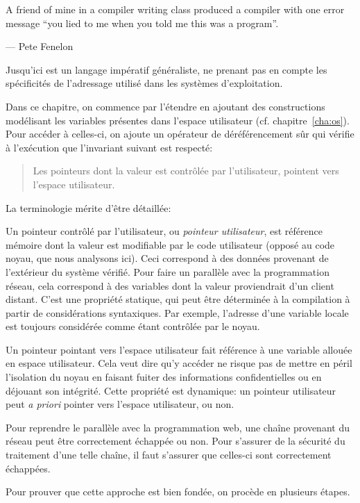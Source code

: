 \epigraph{
  A friend of mine in a compiler writing class produced a compiler with
  one error message ``you lied to me when you told me this was a program''.
  }
  {--- \textup{Pete Fenelon}}

Jusqu'ici \langname{} est un langage impératif généraliste, ne prenant pas en
compte les spécificités de l'adressage utilisé dans les systèmes d'exploitation.

Dans ce chapitre, on commence par l'étendre en ajoutant des constructions
modélisant les variables présentes dans l'espace utilisateur (cf.
chapitre~\ref{cha:os}). Pour accéder à celles-ci, on ajoute un opérateur de
déréférencement sûr qui vérifie à l'exécution que l'invariant suivant est
respecté:

\begin{quote}
Les pointeurs dont la valeur est contrôlée par l'utilisateur, pointent vers
l'espace utilisateur.
\end{quote}

La terminologie mérite d'être détaillée:

Un pointeur contrôlé par l'utilisateur, ou \emph{pointeur utilisateur}, est
référence mémoire dont la valeur est modifiable par le code utilisateur (opposé
au code noyau, que nous analysons ici). Ceci correspond à des données provenant
de l'extérieur du système vérifié. Pour faire un parallèle avec la programmation
réseau, cela correspond à des variables dont la valeur proviendrait d'un client
distant. C'est une propriété statique, qui peut être déterminée à la compilation
à partir de considérations syntaxiques. Par exemple, l'adresse d'une variable
locale est toujours considérée comme étant contrôlée par le noyau.

Un pointeur pointant vers l'espace utilisateur fait référence à une variable
allouée en espace utilisateur. Cela veut dire qu'y accéder ne risque pas de
mettre en péril l'isolation du noyau en faisant fuiter des informations
confidentielles ou en déjouant son intégrité. Cette propriété est dynamique: un
pointeur utilisateur peut \emph{a priori} pointer vers l'espace utilisateur, ou
non.

Pour reprendre le parallèle avec la programmation web, une chaîne provenant du
réseau peut être correctement échappée ou non. Pour s'assurer de la sécurité du
traitement d'une telle chaîne, il faut s'assurer que celles-ci sont correctement
échappées.

Pour prouver que cette approche est bien fondée, on procède en plusieurs étapes.

